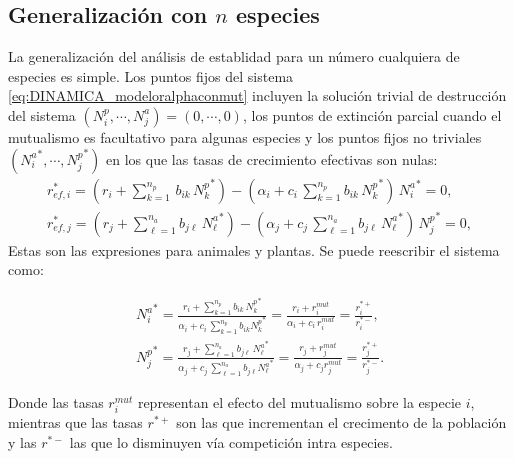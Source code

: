 \subsection{Generalización con $n$ especies}
 
La generalización del análisis de establidad para un número cualquiera de especies es simple. Los puntos fijos del sistema \ref{eq:DINAMICA_modeloralphaconmut} incluyen la solución trivial de destrucción del sistema $(N_{i}^p,\cdots, N_{j}^a) = (0, \cdots,0)$, los puntos de extinción parcial cuando el mutualismo es facultativo para algunas especies y los puntos fijos no triviales $({N^{a}_{i}}^*,\cdots,{N^{p}_{j}}^*)$ en los que las tasas de crecimiento efectivas son nulas:
\begin{align}
r^{*}_{ef,i}  = (r_{i}+ \sum_{k=1}^{n_{p}}\,  b_{ik}\, {N^p_{k}}^*)- (\alpha_{i}+c_{i}\, \sum_{k=1}^{n_{p}} b_{ik}\, {N^{p}_k}^* )\, {N^{a}_{i}}^* = 0 \nonumber ,\\
r^{*}_{ef,j}  = (r_{j}+ \sum_{\ell=1}^{n_{a}} b_{j\ell}\, {N^{a}_{\ell}}^*)- (\alpha_{j}+c_{j}\, \sum_{\ell=1}^{n_{a}} b_{j\ell}\, {N^{a}_\ell}^* )\, {N^{p}_{j}}^* 
=0 ,
\label{eq:effrate2}
\end{align}
Estas son las expresiones para animales y plantas. Se puede reescribir el sistema como:

\begin{align}  
{N^{a}_{i}}^* = \frac{r_{i}+\sum_{k=1}^{n_{p}}b_{ik}\, {N^{p}_{k}}^*}{\alpha_{i}+c_{i}\,\sum_{k=1}^{n_{p}}{b_{ik}N^{p}_{k}}^*} = 
  \frac{r_{i}+r_{i}^{mut}}{\alpha_{i}+c_{i}\, r_{i}^{mut}} = 
  \frac{r_{i}^{*+}}{r_{i}^{*-}} , \nonumber\\
{N^{p}_{j}}^*=\frac{r_{j}+\sum_{\ell=1}^{n_{a}}b_{j\ell}\, {N^{a}_{\ell}}^*}{\alpha_{j}+c_{j}\,\sum_{\ell=1}^{n_{a}}{b_{j\ell}N^{a}_{\ell}}^*} =
  \frac{r_{j}+r_{j}^{mut}}{\alpha_{j}+c_{j}r_{j}^{mut}} =
  \frac{r_{j}^{*+}}{r_{j}^{*-}} .
\end{align}

Donde las tasas $r_{i}^{mut}$ representan el efecto del mutualismo sobre la especie $i$, mientras que las tasas $r^{*+}$ son las que incrementan el crecimento de la población y las $r^{*-}$ las que lo disminuyen vía competición intra especies. 

